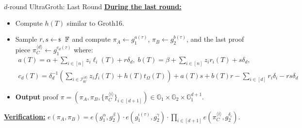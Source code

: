 \documentclass{zkdl-presentation-template}
\begin{document}
    \begin{frame}{$d$-round UltraGroth: Last Round}
        \underline{\textbf{During the last round:}}
        \begin{itemize}
            \item Compute $h(T)$ similar to Groth16.\pause
            \item Sample $r,s \leftarrowS \mathbb{F}$ and compute $\pi_A \gets
            g_1^{a(\tau)}$, $\pi_B \gets g_2^{b(\tau)}$, and the last proof
            piece $\pi_C^{\langle d \rangle} \gets g_1^{c_d(\tau)}$ where:
            {\small\begin{gather*}
                a(T) = \alpha + \sum_{i \in [n]} z_i\ell_i(T) + r\delta_d, \; b(T) = \beta + \sum_{i \in [n]}z_ir_i(T) + s\delta_d, \\
                c_d(T) = \delta_d^{-1}\left(\sum_{i \in \mathcal{I}_W^{\langle d \rangle}}z_if_i(T) + h(T)t_{\Omega}(T)\right) + a(T)s+b(T)r-\sum_{i \in [d]}r_i\delta_i - rs\delta_d
            \end{gather*}}
            \pause\item \textbf{Output} proof $\pi = (\pi_A,\pi_B,\{\pi_C^{\langle i
            \rangle}\}_{i \in [d+1]}) \in \mathbb{G}_1 \times \mathbb{G}_2
            \times \mathbb{G}_1^{d+1}$. \pause
        \end{itemize}

        \underline{\textbf{Verification:}} $e(\pi_A,\pi_B) = e(g_1^{\alpha},g_2^{\beta}) \cdot e(g_1^{\iota(\tau)},g_2^{\gamma}) \cdot \prod_{i \in [d+1]}e(\pi_C^{\langle i \rangle}, g_2^{\delta_i})$.
    \end{frame}
\end{document}
